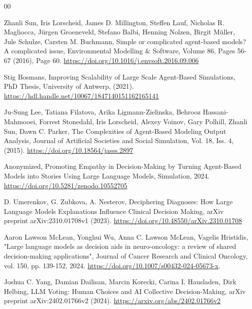 \documentclass[preprint,12pt]{elsarticle}
\begin{document}
\begin{thebibliography}{00}


Zhanli Sun, Iris Lorscheid, James D. Millington, Steffen Lauf, Nicholas R. Magliocca, Jürgen Groeneveld, Stefano Balbi, Henning Nolzen, Birgit Müller, Jule Schulze, Carsten M. Buchmann,
Simple or complicated agent-based models? A complicated issue,
Environmental Modelling & Software, Volume 86, Pages 56-67 (2016), Page 60.
\href{https://doi.org/10.1016/j.envsoft.2016.09.006}{https://doi.org/10.1016/j.envsoft.2016.09.006}


Stig Bosmans, Improving Scalability of Large Scale Agent-Based Simulations, PhD Thesis, University of Antwerp, (2021).
\href{https://hdl.handle.net/10067/1847140151162165141}{https://hdl.handle.net/10067/1847140151162165141}

Ju-Sung Lee, Tatiana Filatova, Arika Ligmann-Zielinska, Behrooz Hassani-Mahmooei, Forrest Stonedahl, Iris Lorscheid, Alexey Voinov, Gary Polhill, Zhanli Sun, Dawn C. Parker,
The Complexities of Agent-Based Modeling Output Analysis,
Journal of Artificial Societies and Social Simulation, Vol. 18, Iss. 4, (2015).
\href{https://doi.org/10.18564/jasss.2897}{https://doi.org/10.18564/jasss.2897}

Anonymized,
Promoting Empathy in Decision-Making by Turning Agent-Based Models into Stories Using Large Language Models,
Simulation, 2024.
\href{https://doi.org/10.5281/zenodo.10552705}{https://doi.org/10.5281/zenodo.10552705}



D. Umerenkov, G. Zubkova, A. Nesterov,
Deciphering Diagnoses: How Large Language Models Explanations Influence Clinical Decision Making,
arXiv preprint arXiv:2310.01708v1 (2023).
\href{https://doi.org/10.48550/arXiv.2310.01708}{https://doi.org/10.48550/arXiv.2310.01708}

Aaron Lawson McLean, Yonghui Wu, Anna C. Lawson McLean, Vagelis Hristidis,
"Large language models as decision aids in neuro-oncology: a review of shared decision-making applications",
Journal of Cancer Research and Clinical Oncology, vol. 150, pp. 139-152, 2024.
\href{https://doi.org/10.1007/s00432-024-05673-x}{https://doi.org/10.1007/s00432-024-05673-x}.

Joshua C. Yang, Damian Dailisan, Marcin Korecki, Carina I. Hausladen, Dirk Helbing, 
LLM Voting: Human Choices and AI Collective Decision-Making,
arXiv preprint arXiv:2402.01766v2 (2024).
\href{https://arxiv.org/abs/2402.01766v2}{https://arxiv.org/abs/2402.01766v2}


\end{thebibliography}
\end{document}
